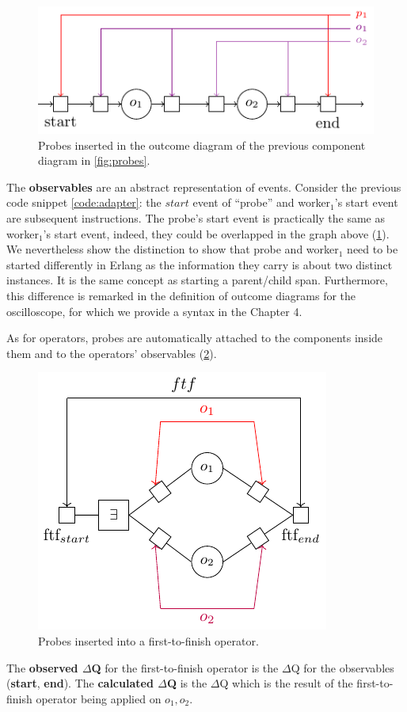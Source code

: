         \begin{figure}[H]
            \begin{center}
                \includegraphics[scale=1.3]{tikz/probe_1.pdf}
            \end{center}
            \caption{Probes inserted in the outcome diagram of the previous component diagram in \cref{fig:probes}.}
            \label{fig:probes_o}
        \end{figure}
       
    The \textbf{observables} are an abstract representation of events. Consider the previous code snippet \cref{code:adapter}: the $start$ event of ``probe'' and worker$_1$'s start event are subsequent instructions. The probe's start event is practically the same as worker$_1$'s start event, indeed, they could be overlapped in the graph above (\cref{fig:probes_o}). We nevertheless show the distinction to show that probe and worker$_1$ need to be started differently in Erlang as the information they carry is about two distinct instances. It is the same concept as starting a parent/child span. Furthermore, this difference is remarked in the definition of outcome diagrams for the oscilloscope, for which we provide a syntax in the Chapter 4. 
    
    As for operators, probes are automatically attached to the components inside them and to the operators' observables (\cref{fig:probes_op}). 

       \begin{figure}[H]
           \begin{center}
                \includegraphics[scale = 1.3]{tikz/probe_2.pdf}
            \end{center}
            \caption{Probes inserted into a first-to-finish operator.}
            \label{fig:probes_op}
       \end{figure}
    
    The \textbf{observed $\Delta$Q} for the first-to-finish operator is the $\Delta$Q for the observables (\textbf{start}, \textbf{end}). The \textbf{calculated $\Delta$Q} is the $\Delta$Q which is the result of the first-to-finish operator being applied on $o_1, o_2$.
